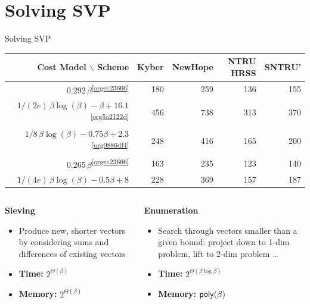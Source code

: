 \documentclass[xcolor=table,10pt,aspectratio=169]{beamer}
\def\enumworstfit{\(1/(2e)\, \beta \log(\beta) - \beta + 16.1\)}
\def\enumavgfit{\(1/8\,\beta \log(\beta) - 0.75\beta + 2.3\)}
\def\qenumworstfit{\(1/(4e)\, \beta \log(\beta) - 0.5\beta + 8\)}
\def\robl{\rowcolor{DarkBlue!20}}
\def\rore{\rowcolor{DarkRed!20}}
\begin{document}
\section{Solving SVP}
\label{sec:orga283f71}
\begin{frame}[label={sec:orgff93238}]{Solving SVP}
\begin{center}
\small{
\begin{tabular}{rrrrr}
\textbf{Cost Model} $\backslash$    \textbf{Scheme} & \textbf{Kyber} & \textbf{NewHope} & \textbf{NTRU HRSS} & \textbf{SNTRU'}\\
\hline
\rore \(0.292\,β\)\textsuperscript{\ref{orgec23666}} & 180 & 259 & 136 & 155\\
\robl \enumworstfit \textsuperscript{\ref{org5a2122d}} & 456 & 738 & 313 & 370\\
\robl \enumavgfit \textsuperscript{\ref{org0886df4}} & 248 & 416 & 165 & 200\\
\hline
\rore \(0.265\,\beta\)\textsuperscript{\ref{orgec23666}} & 163 & 235 & 123 & 140\\
\robl \qenumworstfit & 228 & 369 & 157 & 187\\
\end{tabular}
}
\end{center}

\begin{columns}[t]
\begin{column}{0.5\columnwidth}
{\color{LightRed} \textbf{Sieving} }


\begin{itemize}
\item Produce new, shorter vectors by considering sums and differences of existing vectors
\item \textbf{Time:} \(2^{\Theta(\beta)}\)
\item \textbf{Memory:} \(2^{\Theta(\beta)}\)
\end{itemize}
\end{column}

\begin{column}{0.5\columnwidth}
{\color{DarkBlue} \textbf{Enumeration} }

\begin{itemize}
\item Search through vectors smaller than a given bound: project down to 1-dim problem, lift to 2-dim problem …
\item \textbf{Time:} \(2^{\Theta(\beta \log \beta)}\)
\item \textbf{Memory:} \(\poly[\beta]\)
\end{itemize}
\end{column}
\end{columns}
\end{frame}
\end{document}
